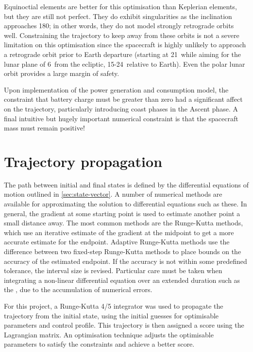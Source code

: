 Equinoctial elements are better for this optimisation than Keplerian elements, but they are still not perfect. They do exhibit singularities as the inclination approaches 180\degrees; in other words, they do not model strongly retrograde orbits well. Constraining the trajectory to keep away from these orbits is not a severe limitation on this optimisation since the spacecraft is highly unlikely to approach a retrograde orbit prior to Earth departure (starting at 21\degrees\ while aiming for the lunar plane of 6\degrees\ from the ecliptic, 15-24\degrees\ relative to Earth). Even the polar lunar orbit provides a large margin of safety.

Upon implementation of the power generation and consumption model, the constraint that battery charge must be greater than zero had a significant affect on the trajectory, particularly introducing coast phases in the Ascent phase. A final intuitive but hugely important numerical constraint is that the spacecraft mass must remain positive! 


\section{Trajectory propagation}
The path between initial and final states is defined by the differential equations of motion outlined in \autoref{sec:state-vector}. A number of numerical methods are available for approximating the solution to differential equations such as these. In general, the gradient at some starting point is used to estimate another point a small distance away. The most common methods are the Runge-Kutta methods, which use an iterative estimate of the gradient at the midpoint to get a more accurate estimate for the endpoint. Adaptive Runge-Kutta methods use the difference between two fixed-step Runge-Kutta methods to place bounds on the accuracy of the estimated endpoint. If the accuracy is not within some predefined tolerance, the interval size is revised. Particular care must be taken when integrating a non-linear differential equation over an extended duration such as the \BW, due to the accumulation of numerical errors.

For this project, a Runge-Kutta 4/5 integrator was used to propagate the trajectory from the initial state, using the initial guesses for optimisable parameters and control profile. This trajectory is then assigned a score using the Lagrangian matrix. An optimisation technique adjusts the optimisable parameters to satisfy the constraints and achieve a better score. %

